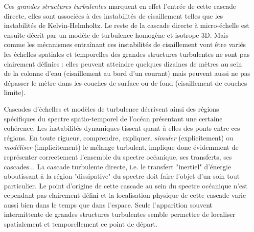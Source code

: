 Ces \textit{grandes structures turbulentes} marquent en effet l'entrée de cette cascade directe, elles sont associées à des instabilités de cisaillement telles que les instabilités de Kelvin-Helmholtz. Le reste de la cascade directe à micro-échelle est ensuite décrit par un modèle de turbulence homogène et isotrope 3D. Mais comme les mécanismes entraînant ces instabilités de cisaillement vont être variés les échelles spatiales et temporelles des grandes structures turbulentes ne sont pas clairement définies : elles peuvent atteindre quelques dizaines de mètres au sein de la colonne d'eau (cisaillement au bord d'un courant) mais peuvent aussi ne pas dépasser le mètre dans les couches de surface ou de fond (cisaillement de couches limite).

Cascades d'échelles et modèles de turbulence décrivent ainsi des régions spécifiques du spectre spatio-temporel de l'océan présentant une certaine cohérence. Les instabilités dynamiques tissent quant à elles des ponts entre ces régions. En toute rigueur, comprendre, expliquer, \textit{simuler} (explicitement) ou \textit{modéliser} (implicitement) le mélange turbulent, implique donc évidemment de représenter correctement l'ensemble du spectre océanique, ses transferts, ses cascades... La cascade turbulente directe, i.e. le transfert "inertiel" d'énergie aboutissant à la région "dissipative" du spectre doit faire l'objet d'un soin tout particulier. Le point d'origine de cette cascade au sein du spectre océanique n'est cependant pas clairement défini et la localisation physique de cette cascade varie aussi bien dans le temps que dans l'espace. Seule l'apparition souvent intermittente de grandes structures turbulentes semble permettre de localiser spatialement et temporellement ce point de départ.

